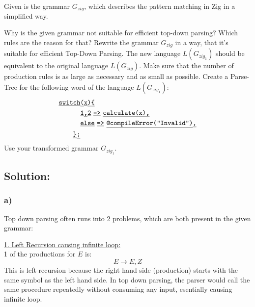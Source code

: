 \documentclass[10pt, a4paper]{article}
\begin{document}


Given is the grammar $G_{zig}$, which describes the pattern matching in Zig in a simplified way.


\begin{abcliste}
    \abc Why is the given grammar not suitable for efficient top-down parsing? Which rules are the reason for that?
    \abc Rewrite the grammar $G_{zig}$ in a way, that it's suitable for efficient Top-Down Parsing. The new language $L(G_{zig_1})$ should be equivalent to the original language $L(G_{zig})$. Make sure that the number of production rules is as large as necessary and as small as possible.
    \abc Create a Parse-Tree for the following word of the language $L(G_{zig_1})$:
    \begin{align*}
        \terminal{switch} &\terminal{(}\terminal{x}\terminal{)} \terminal{\{} \\
        &\terminal{1}\terminal{,}\terminal{2} \ \terminal{=>} \ \terminal{calculate(x)} \terminal{,} \\
        &\terminal{else} \ \terminal{=>} \ \terminal{@compileError(\textquotedbl Invalid\textquotedbl )} \terminal{,} \\
    \terminal{\}}\terminal{;} \\
    \end{align*}
    Use your transformed grammar $G_{zig_1}$.
\end{abcliste}

%  
\subsection{Solution:}

\subsubsection{a)}
Top down parsing often runs into 2 problems, which are both present in the given grammar:

\quad\quad\underline{1. Left Recursion causing infinite loop:}\\
   1 of the productions for \( E \) is:
     \[
     E \rightarrow E , Z 
     \]
   This is left recursion because the right hand side (production) starts with the same symbol as the left hand side. In top down parsing, the parser would call the same procedure repeatedly without consuming any input, esentially causing infinite loop. \\
\end{document}
